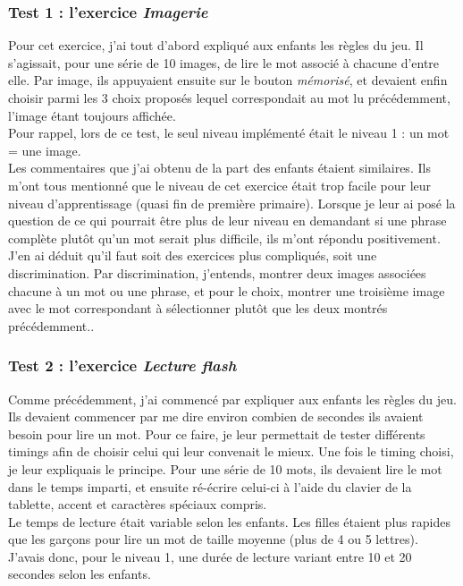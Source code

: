 \subsubsection{Test 1 : l'exercice \textit{Imagerie}}
Pour cet exercice, j'ai tout d'abord expliqué aux enfants les règles du jeu. Il s'agissait, pour une série de 10 images, de lire le mot associé à chacune d'entre elle. Par image, ils appuyaient ensuite sur le bouton \textit{mémorisé}, et devaient enfin choisir parmi les 3 choix proposés lequel correspondait au mot lu précédemment, l'image étant toujours affichée.\\

Pour rappel, lors de ce test, le seul niveau implémenté était le niveau 1 : un mot = une image.\\

Les commentaires que j'ai obtenu de la part des enfants étaient similaires. Ils m'ont tous mentionné que le niveau de cet exercice était trop facile pour leur niveau d'apprentissage (quasi fin de première primaire). Lorsque je leur ai posé la question de ce qui pourrait être plus de leur niveau en demandant si une phrase complète plutôt qu'un mot serait plus difficile, ils m'ont répondu positivement. J'en ai déduit qu'il faut soit des exercices plus compliqués, soit une discrimination. Par discrimination, j'entends, montrer deux images associées chacune à un mot ou une phrase, et pour le choix, montrer une troisième image avec le mot correspondant à sélectionner plutôt que les deux montrés précédemment..

\subsubsection{Test 2 : l'exercice \textit{Lecture flash}}
Comme précédemment, j'ai commencé par expliquer aux enfants les règles du jeu.
Ils devaient commencer par me dire environ combien de secondes ils avaient besoin pour lire un mot. Pour ce faire, je leur permettait de tester différents timings afin de choisir celui qui leur convenait le mieux. Une fois le timing choisi, je leur expliquais le principe. Pour une série de 10 mots, ils devaient lire le mot dans le temps imparti, et ensuite ré-écrire celui-ci à l'aide du clavier de la tablette, accent et caractères spéciaux compris.\\

Le temps de lecture était variable selon les enfants. Les filles étaient plus rapides que les garçons pour lire un mot de taille moyenne (plus de 4 ou 5 lettres). J'avais donc, pour le niveau 1, une durée de lecture variant entre 10 et 20 secondes selon les enfants.\\

